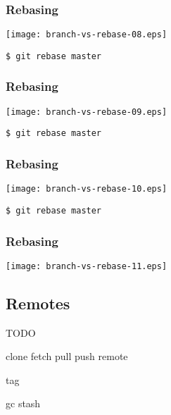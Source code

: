 \documentclass[english]{beamer}
\newcommand{\mysubsection}[2]{%
  \hypertarget{#2}{}%
  \subsection{#1}%
  \label{#2}%
}
\newcommand{\CMD}[1]{%
\texttt{\textcolor{code-green}{#1}}%
}
\begin{document}
\begin{frame}
\frametitle{Rebasing}

\texttt{[image: branch-vs-rebase-08.eps]}
\vspace{\baselineskip}
\begin{flushright}
        \CMD{\$ git rebase master}
\end{flushright}
\vspace{\textheight}
\end{frame}

\begin{frame}
\frametitle{Rebasing}

\texttt{[image: branch-vs-rebase-09.eps]}
\vspace{\baselineskip}
\begin{flushright}
        \CMD{\$ git rebase master}
\end{flushright}
\vspace{\textheight}
\end{frame}

\begin{frame}
\frametitle{Rebasing}

\texttt{[image: branch-vs-rebase-10.eps]}
\vspace{\baselineskip}
\begin{flushright}
        \CMD{\$ git rebase master}
\end{flushright}
\vspace{\textheight}
\end{frame}

\begin{frame}
\frametitle{Rebasing}

\texttt{[image: branch-vs-rebase-11.eps]}
\vspace{\textheight}
\end{frame}

\mysubsection{Remotes}{using:remotes}

\begin{frame}
        TODO

clone
fetch
pull
push
remote

tag

gc
stash


\end{frame}

\end{document}
